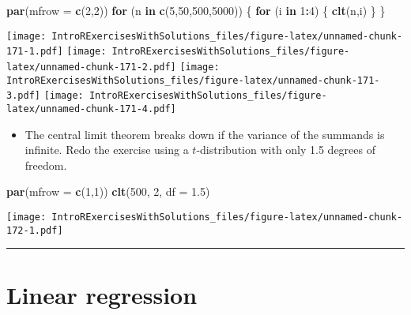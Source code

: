\documentclass[]{article}
\newenvironment{Shaded}{\begin{snugshade}}{\end{snugshade}}
\newcommand{\KeywordTok}[1]{\textcolor[rgb]{0.13,0.29,0.53}{\textbf{#1}}}
\newcommand{\DataTypeTok}[1]{\textcolor[rgb]{0.13,0.29,0.53}{#1}}
\newcommand{\DecValTok}[1]{\textcolor[rgb]{0.00,0.00,0.81}{#1}}
\newcommand{\FloatTok}[1]{\textcolor[rgb]{0.00,0.00,0.81}{#1}}
\newcommand{\ControlFlowTok}[1]{\textcolor[rgb]{0.13,0.29,0.53}{\textbf{#1}}}
\newcommand{\OperatorTok}[1]{\textcolor[rgb]{0.81,0.36,0.00}{\textbf{#1}}}
\newcommand{\NormalTok}[1]{#1}
\providecommand{\tightlist}{%
  \setlength{\itemsep}{0pt}\setlength{\parskip}{0pt}}
\begin{document}
\begin{Shaded}
\begin{Highlighting}[]
\KeywordTok{par}\NormalTok{(}\DataTypeTok{mfrow =} \KeywordTok{c}\NormalTok{(}\DecValTok{2}\NormalTok{,}\DecValTok{2}\NormalTok{))}
\ControlFlowTok{for}\NormalTok{ (n }\ControlFlowTok{in} \KeywordTok{c}\NormalTok{(}\DecValTok{5}\NormalTok{,}\DecValTok{50}\NormalTok{,}\DecValTok{500}\NormalTok{,}\DecValTok{5000}\NormalTok{)) \{}
  \ControlFlowTok{for}\NormalTok{ (i }\ControlFlowTok{in} \DecValTok{1}\OperatorTok{:}\DecValTok{4}\NormalTok{) \{}
    \KeywordTok{clt}\NormalTok{(n,i)}
\NormalTok{  \}}
\NormalTok{\}}
\end{Highlighting}
\end{Shaded}

\texttt{[image: IntroRExercisesWithSolutions\_files/figure-latex/unnamed-chunk-171-1.pdf]}
\texttt{[image: IntroRExercisesWithSolutions\_files/figure-latex/unnamed-chunk-171-2.pdf]}
\texttt{[image: IntroRExercisesWithSolutions\_files/figure-latex/unnamed-chunk-171-3.pdf]}
\texttt{[image: IntroRExercisesWithSolutions\_files/figure-latex/unnamed-chunk-171-4.pdf]}

\begin{itemize}
\tightlist
\item
  The central limit theorem breaks down if the variance of the summands
  is infinite. Redo the exercise using a \(t\)-distribution with only
  1.5 degrees of freedom.
\end{itemize}

\begin{Shaded}
\begin{Highlighting}[]
\KeywordTok{par}\NormalTok{(}\DataTypeTok{mfrow =} \KeywordTok{c}\NormalTok{(}\DecValTok{1}\NormalTok{,}\DecValTok{1}\NormalTok{))}
\KeywordTok{clt}\NormalTok{(}\DecValTok{500}\NormalTok{, }\DecValTok{2}\NormalTok{, }\DataTypeTok{df =} \FloatTok{1.5}\NormalTok{)}
\end{Highlighting}
\end{Shaded}

\texttt{[image: IntroRExercisesWithSolutions\_files/figure-latex/unnamed-chunk-172-1.pdf]}

\begin{center}\rule{0.5\linewidth}{\linethickness}\end{center}

\section{Linear regression}\label{linear-regression}
\end{document}
